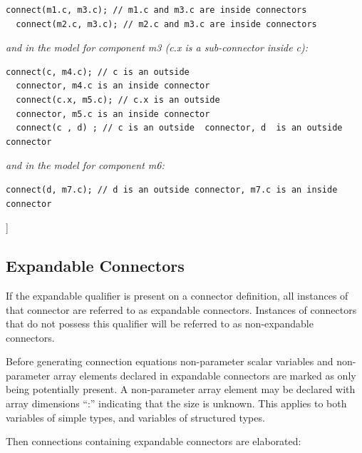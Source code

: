 \documentclass[10pt,a4paper]{report}
\def\doublelabel#1{\label{#1}}
\begin{document}
\begin{lstlisting}[language=modelica]
  connect(m1.c, m3.c); // m1.c and m3.c are inside connectors
  connect(m2.c, m3.c); // m2.c and m3.c are inside connectors
\end{lstlisting}
\emph{and in the model for component m3 (c.x is a sub-connector inside
c):}

\begin{lstlisting}[language=modelica]
  connect(c, m4.c); // c is an outside
  connector, m4.c is an inside connector
  connect(c.x, m5.c); // c.x is an outside
  connector, m5.c is an inside connector
  connect(c , d) ; // c is an outside  connector, d  is an outside connector
\end{lstlisting}
\emph{and in the model for component m6:}

\begin{lstlisting}[language=modelica]
  connect(d, m7.c); // d is an outside connector, m7.c is an inside connector
\end{lstlisting}
{]}

\subsection{Expandable Connectors}\doublelabel{expandable-connectors}

If the expandable qualifier is present on a connector definition, all
instances of that connector are referred to as expandable connectors.
Instances of connectors that do not possess this qualifier will be
referred to as non-expandable connectors.

Before generating connection equations non-parameter scalar variables
and non-parameter array elements declared in expandable connectors are
marked as only being potentially present. A non-parameter array element
may be declared with array dimensions ``:'' indicating that the size is
unknown. This applies to both variables of simple types, and variables
of structured types.

Then connections containing expandable connectors are elaborated:
\end{document}
